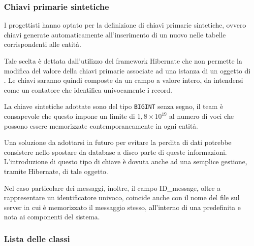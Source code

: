 \subsubsection{Chiavi primarie sintetiche}
I progettisti hanno optato per la definizione di chiavi primarie sintetiche, ovvero chiavi generate automaticamente all'inserimento di un nuovo  nelle tabelle corrispondenti alle entità.

Tale scelta è dettata dall'utilizzo del framework Hibernate che non permette la modifica del valore della chiavi primarie associate ad una istanza di un oggetto di . Le chiavi saranno quindi composte da un campo a valore intero, da intendersi come un contatore che identifica univocamente i record.

La chiave sintetiche adottate sono del tipo \texttt{BIGINT} senza segno, il team è consapevole che questo impone un limite di $1,8 \times10^{19}$ al numero di voci che possono essere memorizzate contemporaneamente in ogni entità.

Una soluzione da adottarsi in futuro per evitare la perdita di dati potrebbe consistere nello spostare da database a disco parte di queste informazioni.
L'introduzione di questo tipo di chiave è dovuta anche ad una semplice gestione, tramite Hibernate, di tale oggetto.

Nel caso particolare dei messaggi, inoltre, il campo ID\_message, oltre a rappresentare un identificatore univoco, coincide anche con il nome del file sul server in cui è memorizzato il messaggio stesso, all'interno di una  predefinita e nota ai componenti del sistema.
\clearpage

\subsubsection{Lista delle classi}

